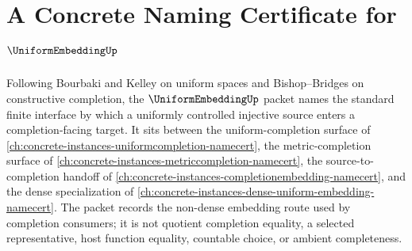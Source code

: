 \chapter{A Concrete Naming Certificate for $\UniformEmbeddingUp$}
\label{ch:concrete-instances-uniform-embedding-namecert}

Following Bourbaki and Kelley on uniform spaces and Bishop--Bridges on constructive completion, the $\UniformEmbeddingUp$ packet names the standard finite interface by which a uniformly controlled injective source enters a completion-facing target. It sits between the uniform-completion surface of \autoref{ch:concrete-instances-uniformcompletion-namecert}, the metric-completion surface of \autoref{ch:concrete-instances-metriccompletion-namecert}, the source-to-completion handoff of \autoref{ch:concrete-instances-completionembedding-namecert}, and the dense specialization of \autoref{ch:concrete-instances-dense-uniform-embedding-namecert}. The packet records the non-dense embedding route used by completion consumers; it is not quotient completion equality, a selected representative, host function equality, countable choice, or ambient completeness.

